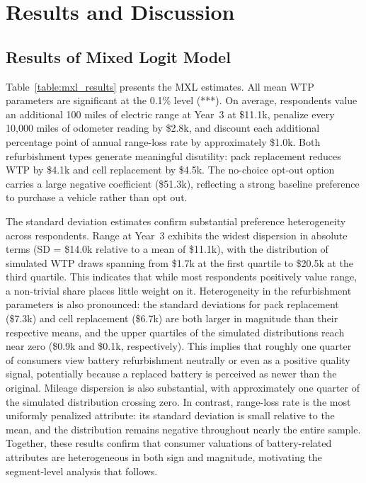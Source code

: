 \documentclass[a4paper,fleqn]{cas-sc}   %
\begin{document}
\section{Results and Discussion}
\label{section:results}

\subsection{Results of Mixed Logit Model}

Table~\ref{table:mxl_results} presents the MXL estimates. All mean WTP parameters are significant at the 0.1\% level (***). On average, respondents value an additional 100 miles of electric range at Year~3 at \$11.1k, penalize every 10,000 miles of odometer reading by \$2.8k, and discount each additional percentage point of annual range-loss rate by approximately \$1.0k. Both refurbishment types generate meaningful disutility: pack replacement reduces WTP by \$4.1k and cell replacement by \$4.5k. The no-choice opt-out option carries a large negative coefficient (\$51.3k), reflecting a strong baseline preference to purchase a vehicle rather than opt out.

The standard deviation estimates confirm substantial preference heterogeneity across respondents. Range at Year~3 exhibits the widest dispersion in absolute terms (SD = \$14.0k relative to a mean of \$11.1k), with the distribution of simulated WTP draws spanning from \$1.7k at the first quartile to \$20.5k at the third quartile. This indicates that while most respondents positively value range, a non-trivial share places little weight on it. Heterogeneity in the refurbishment parameters is also pronounced: the standard deviations for pack replacement (\$7.3k) and cell replacement (\$6.7k) are both larger in magnitude than their respective means, and the upper quartiles of the simulated distributions reach near zero (\$0.9k and \$0.1k, respectively). This implies that roughly one quarter of consumers view battery refurbishment neutrally or even as a positive quality signal, potentially because a replaced battery is perceived as newer than the original. Mileage dispersion is also substantial, with approximately one quarter of the simulated distribution crossing zero. In contrast, range-loss rate is the most uniformly penalized attribute: its standard deviation is small relative to the mean, and the distribution remains negative throughout nearly the entire sample. Together, these results confirm that consumer valuations of battery-related attributes are heterogeneous in both sign and magnitude, motivating the segment-level analysis that follows.
\end{document}
